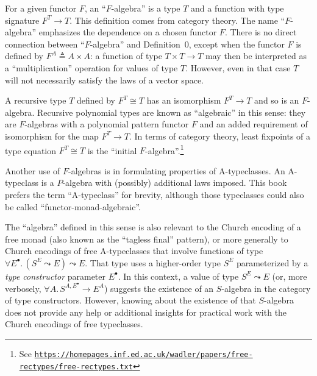 For a given functor $F$, an \textsf{``}$F$-algebra\textsf{''}
is a type $T$ and a function with type signature $F^{T}\rightarrow T$.
This definition comes from category theory. The name \textsf{``}$F$-algebra\textsf{''}
emphasizes the dependence on a chosen functor $F$. There is no direct
connection between \textsf{``}$F$-algebra\textsf{''} and Definition~0, except when
the functor $F$ is defined by $F^{A}\triangleq A\times A$: a function
of type $T\times T\rightarrow T$ may then be interpreted as a \textsf{``}multiplication\textsf{''}
operation for values of type $T$. However, even in that case $T$
will not necessarily satisfy the laws of a vector space.

A recursive type $T$ defined by $F^{T}\cong T$ has an isomorphism
$F^{T}\rightarrow T$ and so is an $F$-algebra. Recursive polynomial
types are known as \textsf{``}algebraic\textsf{''} in this sense: they are $F$-algebras
with a polynomial pattern functor $F$ and an added requirement of
isomorphism for the map $F^{T}\rightarrow T$. In terms of category
theory, least fixpoints of a type equation $F^{T}\cong T$ is the
\textsf{``}initial $F$-algebra\textsf{''}.\footnote{See \texttt{\href{https://homepages.inf.ed.ac.uk/wadler/papers/free-rectypes/free-rectypes.txt}{https://homepages.inf.ed.ac.uk/wadler/papers/free-rectypes/free-rectypes.txt}} }

Another use of $F$-algebras is in formulating properties of A-typeclasses.
An A-typeclass is a $P$-algebra with (possibly) additional laws imposed.
This book prefers the term \textsf{``}A-typeclass\textsf{''} for brevity, although
those typeclasses could also be called \textsf{``}functor-monad-algebraic\textsf{''}.

The \textsf{``}algebra\textsf{''} defined in this sense is also relevant to the Church
encoding of a free monad (also known as the \textsf{``}tagless final\textsf{''}
pattern), or more generally to Church encodings of free A-typeclasses
that involve functions of type $\forall E^{\bullet}.\,(S^{E}\leadsto E)\leadsto E$.
That type uses a higher-order type $S^{E}$ parameterized by a \emph{type
constructor} parameter $E^{\bullet}$. In this context, a value of
type $S^{E}\leadsto E$ (or, more verbosely, $\forall A.\,S^{A,E^{\bullet}}\rightarrow E^{A}$)
suggests the existence of an $S$-algebra in the category of type
constructors. However, knowing about the existence of that $S$-algebra
does not provide any help or additional insights for practical work
with the Church encodings of free typeclasses.

